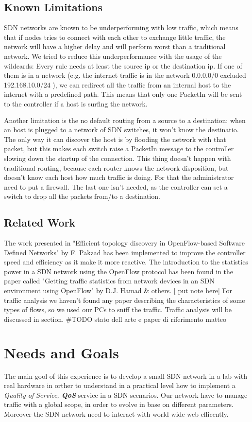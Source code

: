 \documentclass[conference,10pt]{IEEEtran}
\begin{document}
\subsection{Known Limitations}
SDN networks are known to be underperforming with low traffic, which means that if nodes tries to connect with each other
to exchange little traffic, the network will have a higher delay and will perform worst than a
traditional network. We tried to reduce this underperformance with the usage of the wildcards:
Every rule needs at least the source ip or the destination ip. If one of them is in a network
(e.g. the internet traffic is in the network 0.0.0.0/0 excluded 192.168.10.0/24 ),
we can redirect all the traffic from an internal host to the internet with a predefined
path. This means that only one PacketIn will be sent to the controller if a host is surfing the network.

Another limitation is the no default routing from a source to a destination: when an host
is plugged to a network of SDN switches, it won't know the destinatio. The only way it can
discover the host is by flooding the network with that packet, but this makes each switch raise a PacketIn message to the controller
slowing down the startup of the connection. This thing doesn't happen with traditional routing, because each router knows
the network disposition, but doesn't know each host how much traffic is doing. For that the administrator need to put a firewall.
The last one isn't needed, as the controller can set a switch to drop all the packets from/to a destination.


\subsection{Related Work}
  The work presented in 
"Efficient topology discovery in OpenFlow-based Software Defined Networks" by F. Pakzad \cite{farzaneh} 
has been implemented to improve the controller speed and efficiency as it make it more reactive.
The introduction to the statistics power in a SDN network using the OpenFlow protocol has been found 
in the paper called "Getting traffic statistics from network devices in an SDN environment using OpenFlow" by D.J. Hamad \& others. [ put note here]
For traffic analysis we haven't found any paper describing the characteristics of
some types of flows, so we used our PCs to sniff the traffic. Traffic analysis will be discussed in section.
  \#TODO stato dell arte e paper di riferimento  matteo

\section{Needs and Goals}\label{sec:obb} %
The main gool of this experience is to develop a small SDN network in a lab with real hardware
in orther to understand in a practical level how to implement a \textit{Quality of Service, \textbf{QoS}} service in a SDN scenarios.
Our network have to manage traffic with a global scope, in order to evolve in base on different parameters.
Moreover the SDN network need to interact with world wide web efficently.
\end{document}

